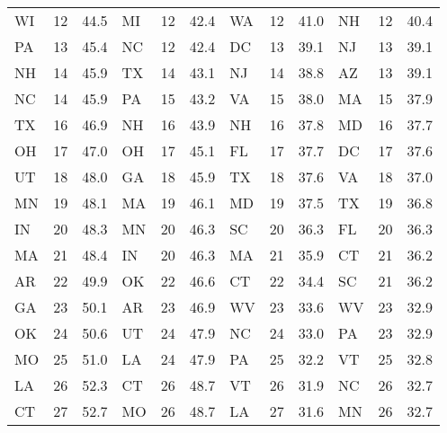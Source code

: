\begin{longtable}{lrr|lrr||lrr|lrr}
        WI &   12 &   44.5 &            MI &   12 &  42.4 &             WA &   12 &   41.0 &            NH &   12 &   40.4 \\
        PA &   13 &   45.4 &            NC &   12 &  42.4 &             DC &   13 &   39.1 &            NJ &   13 &   39.1 \\
        NH &   14 &   45.9 &            TX &   14 &  43.1 &             NJ &   14 &   38.8 &            AZ &   13 &   39.1 \\
        NC &   14 &   45.9 &            PA &   15 &  43.2 &             VA &   15 &   38.0 &            MA &   15 &   37.9 \\
        TX &   16 &   46.9 &            NH &   16 &  43.9 &             NH &   16 &   37.8 &            MD &   16 &   37.7 \\
        OH &   17 &   47.0 &            OH &   17 &  45.1 &             FL &   17 &   37.7 &            DC &   17 &   37.6 \\
        UT &   18 &   48.0 &            GA &   18 &  45.9 &             TX &   18 &   37.6 &            VA &   18 &   37.0 \\
        MN &   19 &   48.1 &            MA &   19 &  46.1 &             MD &   19 &   37.5 &            TX &   19 &   36.8 \\
        IN &   20 &   48.3 &            MN &   20 &  46.3 &             SC &   20 &   36.3 &            FL &   20 &   36.3 \\
        MA &   21 &   48.4 &            IN &   20 &  46.3 &             MA &   21 &   35.9 &            CT &   21 &   36.2 \\
        AR &   22 &   49.9 &            OK &   22 &  46.6 &             CT &   22 &   34.4 &            SC &   21 &   36.2 \\
        GA &   23 &   50.1 &            AR &   23 &  46.9 &             WV &   23 &   33.6 &            WV &   23 &   32.9 \\
        OK &   24 &   50.6 &            UT &   24 &  47.9 &             NC &   24 &   33.0 &            PA &   23 &   32.9 \\
        MO &   25 &   51.0 &            LA &   24 &  47.9 &             PA &   25 &   32.2 &            VT &   25 &   32.8 \\
        LA &   26 &   52.3 &            CT &   26 &  48.7 &             VT &   26 &   31.9 &            NC &   26 &   32.7 \\
        CT &   27 &   52.7 &            MO &   26 &  48.7 &             LA &   27 &   31.6 &            MN &   26 &   32.7 \\

\end{longtable}
